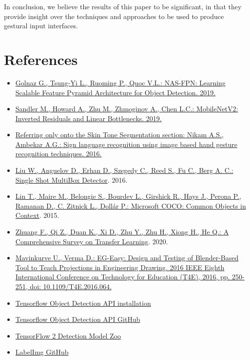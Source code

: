 \documentclass[a4paper, 12pt]{article}
\begin{document}
\begin{flushleft}
In conclusion, we believe the results of this paper to be significant, in that they provide insight over the techniques and approaches to be used to produce gestural input interfaces.\linebreak

\end{flushleft}

\onecolumn

\section{References}
\label{References}
\begin{flushleft}
\begin{itemize}
    \item \label{RefSSD} \href{https://arxiv.org/pdf/1904.07392}{Golnaz G., Tsung-Yi L., Ruoming P., Quoc V.L.: NAS-FPN: Learning Scalable Feature Pyramid Architecture for Object Detection. 2019.}
    \item \label{RefArchSSD} \href{https://arxiv.org/pdf/1801.04381.pdf}{Sandler M., Howard A., Zhu M., Zhmoginov A., Chen L.C.: MobileNetV2: Inverted Residuals and Linear Bottlenecks. 2019.}
    \item  \href{https://ieeexplore.ieee.org/document/7916786}{Referring only onto the Skin Tone Segmentation section: Nikam A.S., Ambekar A.G.: Sign language recognition using image based hand gesture recognition techniques. 2016.}
    \item \label{Ref1} \href{https://arxiv.org/abs/1512.02325}{Liu W., Anguelov D., Erhan D., Szegedy C., Reed S., Fu C., Berg A. C.: Single Shot MultiBox Detector}. 2016.
    \item \label{Ref2} \href{https://arxiv.org/abs/1405.0312}{Lin T., Maire M., Belongie S., Bourdev L., Girshick R., Hays J., Perona P., Ramanan D., C. Zitnick L., Dollár P.: Microsoft COCO: Common Objects in Context}. 2015.
    \item \label{Ref3} \href{https://arxiv.org/abs/1911.02685}{Zhuang F., Qi Z., Duan K., Xi D., Zhu Y., Zhu H., Xiong H., He Q.: A Comprehensive Survey on Transfer Learning}. 2020.
    \item \label{Ref4} \href{https://ieeexplore.ieee.org/document/7814839}{Mavinkurve U., Verma D.: EG-Easy: Design and Testing of Blender-Based Tool to Teach Projections in Engineering Drawing. 2016 IEEE Eighth International Conference on Technology for Education (T4E), 2016, pp. 250-251, doi: 10.1109/T4E.2016.064.}
    \item \label{Ref8} \href{https://tensorflow-object-detection-api-tutorial.readthedocs.io/en/latest/}{Tensorflow Object Detection API installation}
    \item \label{Ref9} \href{https://github.com/tensorflow/models/tree/master/research/object_detection}{Tensorflow Object Detection API GitHub}
    \item \label{Ref10} \href{https://github.com/tensorflow/models/blob/master/research/object_detection/g3doc/tf2_detection_zoo.md}{TensorFlow 2 Detection Model Zoo}
    \item \label{Ref11} \href{https://github.com/tzutalin/labelImg}{LabelImg GitHub}
\end{itemize}
\end{flushleft}
\end{document}
